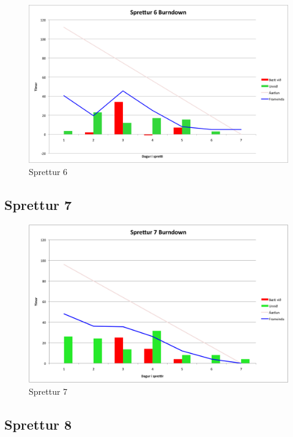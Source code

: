 \documentclass{article}
\begin{document}
\begin{figure}[H]
  \centering
  \includegraphics[width=1\textwidth]{Sprettur6_Burndown.png} 
  \caption{Sprettur 6} 
\end{figure}

\subsection{Sprettur 7}

\begin{figure}[H]
  \centering
  \includegraphics[width=1\textwidth]{Sprettur7_Burndown.png} 
  \caption{Sprettur 7} 
\end{figure}

\subsection{Sprettur 8}
\end{document}
